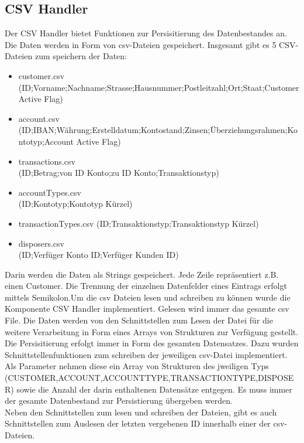\subsection{CSV Handler}
Der CSV Handler bietet Funktionen zur Persisitierung des Datenbestandes an. Die Daten werden in Form von csv-Dateien gespeichert. Insgesamt gibt es 5 CSV-Dateien zum speichern der Daten:
\begin{itemize}
	\item customer.csv\\ (ID;Vorname;Nachname;Strasse;Hausnummer;Postleitzahl;Ort;Staat;Customer Active Flag)
	\item account.csv\\ (ID;IBAN;Währung;Erstelldatum;Kontostand;Zinsen;Überziehungsrahmen;Kontotyp;Account Active Flag)
	\item transactions.csv\\ (ID;Betrag;von ID Konto;zu ID Konto;Transaktionstyp)
	\item accountTypes.csv\\ (ID;Kontotyp;Kontotyp Kürzel)
	\item transactionTypes.csv (ID;Transaktionstyp;Transaktionstyp Kürzel)
	\item disposers.csv\\ (ID;Verfüger Konto ID;Verfüger Kunden ID)
\end{itemize}
Darin werden die Daten als Strings gespeichert. Jede Zeile repräsentiert z.B. einen Customer. Die Trennung der einzelnen Datenfelder eines Eintrags erfolgt mittels Semikolon.Um die csv Dateien lesen und schreiben zu können wurde die Komponente CSV Handler implementiert. Gelesen wird immer das gesamte csv File. Die Daten werden von den Schnittstellen zum Lesen der Datei für die weitere Verarbeitung in Form eines Arrays von Strukturen zur Verfügung gestellt.\\
 Die Persisitierung erfolgt immer in Form des gesamten Datensatzes. Dazu wurden Schnittstellenfunktionen zum schreiben der jeweiligen csv-Datei implementiert. Als Parameter nehmen diese ein Array von Strukturen des jweiligen Typs (CUSTOMER,ACCOUNT,ACCOUNTTYPE,TRANSACTIONTYPE,DISPOSER) sowie die Anzahl der darin enthaltenen Datensätze entgegen. Es muss immer der gesamte Datenbestand zur Persistierung übergeben werden.\\
 Neben den Schnittstellen zum lesen und schreiben der Dateien, gibt es auch Schnittstellen zum Auslesen der letzten vergebenen ID innerhalb einer der csv-Dateien.
